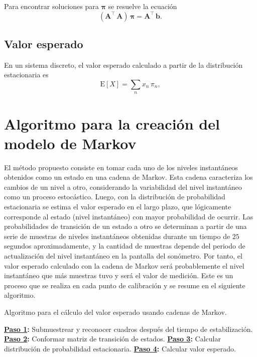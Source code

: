 Para encontrar soluciones para $\boldsymbol{\pi}$ se resuelve la ecuación
\begin{equation}
    \label{eq:pi_linear_system}
    \left(\mathbf{A}^\intercal\,\mathbf{A}\right)\,\boldsymbol{\pi} = \mathbf{A}^\intercal\,\mathbf{b}.
\end{equation}

\subsection*{Valor esperado}

En un sistema discreto, el valor esperado calculado a partir de la distribución estacionaria es
%
\begin{equation}
    \mathrm{E}[X] = \sum_n x_n\,\pi_n,
\end{equation}

\section*{Algoritmo para la creación del modelo de Markov}
El método propuesto consiste en tomar cada uno de los niveles instantáneos obtenidos como un estado en una cadena de
Markov.
Esta cadena caracteriza los cambios de un nivel a otro, considerando la variabilidad del nivel instantáneo como un
proceso estocástico.
Luego, con la distribución de probabilidad estacionaria se estima el valor esperado en el largo plazo, que lógicamente
corresponde al estado (nivel instantáneo) con mayor probabilidad de ocurrir.
Las probabilidades de transición de un estado a otro se determinan a partir de una serie de muestras de niveles
instantáneos obtenidas durante un tiempo de $25$ segundos aproximadamente, y la cantidad de muestras depende del periodo
de actualización del nivel instantáneo en la pantalla del sonómetro.
Por tanto, el valor esperado calculado con la cadena de Markov será probablemente el nivel instantáneo que más muestras
tuvo y será el valor de medición.
Este es un proceso que se realiza en cada punto de calibración y se resume en el siguiente algoritmo.

\begin{algorithm}[H]
    \caption{Algoritmo para el cálculo del valor esperado usando cadenas de Markov.}
    \label{alg:markov_expected_value}
    \scriptsize
    \DontPrintSemicolon
    \BlankLine
    \textbf{\hyperref[sec:downsampling]{Paso 1}:} Submuestrear y reconocer cuadros después del tiempo de estabilización.\;
    \textbf{\hyperref[sec:transition_matrix]{Paso 2}:} Conformar matriz de transición de estados.\;
    \textbf{\hyperref[sec:stationary_distribution]{Paso 3}:} Calcular distribución de probabilidad estacionaria.\;
    \textbf{\hyperref[sec:expected_value]{Paso 4}:} Calcular valor esperado.\;
\end{algorithm}

